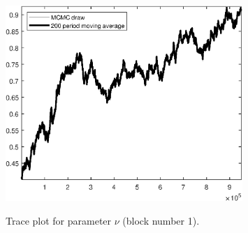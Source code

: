 \begin{figure}[H]
\centering
  \includegraphics[width=0.8\textwidth]{BRS_growth_util_sectoral/graphs/TracePlot_nu_blck_1}\\
    \caption{Trace plot for parameter $\nu$ (block number 1).}
\end{figure}
